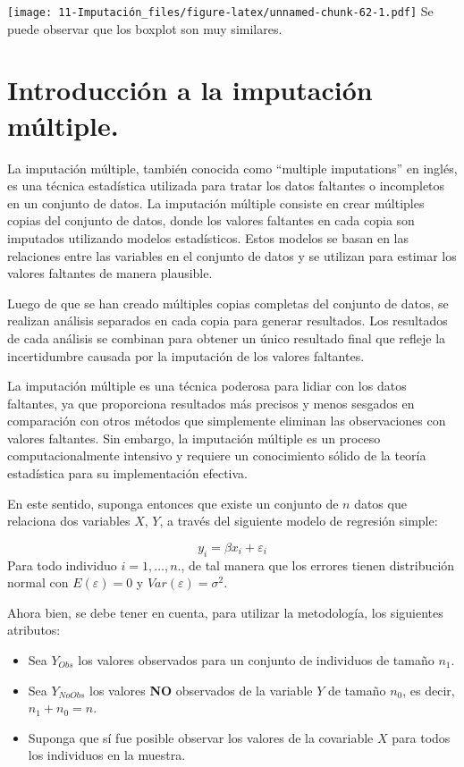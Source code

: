 \documentclass[
  12pt,
]{book}
\providecommand{\tightlist}{%
  \setlength{\itemsep}{0pt}\setlength{\parskip}{0pt}}
\begin{document}
\texttt{[image: 11-Imputación\_files/figure-latex/unnamed-chunk-62-1.pdf]}
Se puede observar que los boxplot son muy similares.

\hypertarget{introducciuxf3n-a-la-imputaciuxf3n-muxfaltiple.}{%
\section{Introducción a la imputación múltiple.}\label{introducciuxf3n-a-la-imputaciuxf3n-muxfaltiple.}}

La imputación múltiple, también conocida como ``multiple imputations'' en inglés, es una técnica estadística utilizada para tratar los datos faltantes o incompletos en un conjunto de datos. La imputación múltiple consiste en crear múltiples copias del conjunto de datos, donde los valores faltantes en cada copia son imputados utilizando modelos estadísticos. Estos modelos se basan en las relaciones entre las variables en el conjunto de datos y se utilizan para estimar los valores faltantes de manera plausible.

Luego de que se han creado múltiples copias completas del conjunto de datos, se realizan análisis separados en cada copia para generar resultados. Los resultados de cada análisis se combinan para obtener un único resultado final que refleje la incertidumbre causada por la imputación de los valores faltantes.

La imputación múltiple es una técnica poderosa para lidiar con los datos faltantes, ya que proporciona resultados más precisos y menos sesgados en comparación con otros métodos que simplemente eliminan las observaciones con valores faltantes. Sin embargo, la imputación múltiple es un proceso computacionalmente intensivo y requiere un conocimiento sólido de la teoría estadística para su implementación efectiva.

En este sentido, suponga entonces que existe un conjunto de \(n\) datos que relaciona dos variables \(X\), \(Y\), a través del siguiente modelo de regresión simple:

\[y_i = \beta x_i + \varepsilon_i\]
Para todo individuo \(i = 1, \ldots, n.\), de tal manera que los errores tienen distribución normal con \(E(\varepsilon) = 0\) y \(Var(\varepsilon) = \sigma ^2\).

Ahora bien, se debe tener en cuenta, para utilizar la metodología, los siguientes atributos:

\begin{itemize}
\tightlist
\item
  Sea \(Y_{Obs}\) los valores observados para un conjunto de individuos de
  tamaño \(n_1\).
\item
  Sea \(Y_{NoObs}\) los valores \textbf{NO} observados de la variable \(Y\) de tamaño
  \(n_0\), es decir, \(n_1 + n_0 = n\).\\
\item
  Suponga que sí fue posible observar los valores de la covariable \(X\) para
  todos los individuos en la muestra.
\end{itemize}
\end{document}
